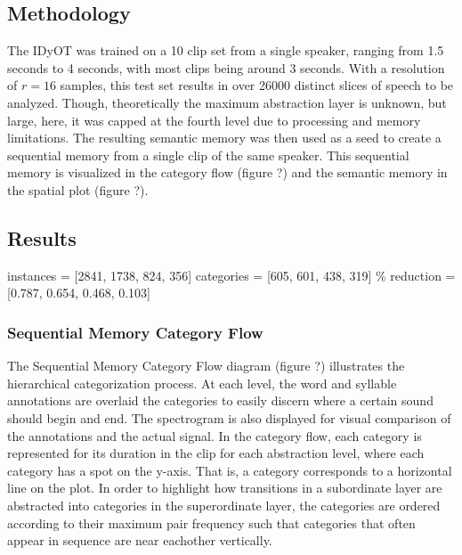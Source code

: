 \documentclass[runningheads]{llncs}
\begin{document}
\subsection{Methodology}

The IDyOT was trained on a 10 clip set from a single speaker, ranging from 1.5 seconds to 4 seconds, with most clips being around 3 seconds.  With a resolution of $r=16$ samples, this test set results in over 26000 distinct slices of speech to be analyzed.  Though, theoretically the maximum abstraction layer is unknown, but large, here, it was capped at the fourth level due to processing and memory limitations.  The resulting semantic memory was then used as a seed to create a sequential memory from a single clip of the same speaker.  This sequential memory is visualized in the category flow (figure ?) and the semantic memory in the spatial plot (figure ?).

\subsection{Results}

instances = [2841, 1738, 824, 356]
categories = [605, 601, 438, 319]
\% reduction = [0.787, 0.654, 0.468, 0.103]

\subsubsection{Sequential Memory Category Flow}

The Sequential Memory Category Flow diagram (figure ?) illustrates the hierarchical categorization process. At each level, the word and syllable annotations are overlaid the categories to easily discern where a certain sound should begin and end.  The spectrogram is also displayed for visual comparison of the annotations and the actual signal.  In the category flow, each category is represented for its duration in the clip for each abstraction level, where each category has a spot on the y-axis.  That is, a category corresponds to a horizontal line on the plot.  In order to highlight how transitions in a subordinate layer are abstracted into categories in the superordinate layer, the categories are ordered according to their maximum pair frequency such that categories that often appear in sequence are near eachother vertically.

\end{document}
